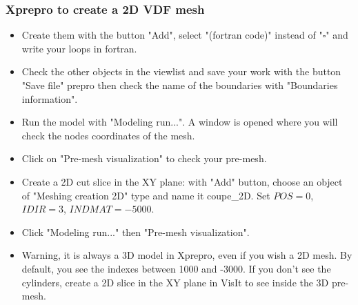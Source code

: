 \documentclass[10pt, hyperref={unicode=true,pdfusetitle, bookmarks=true,bookmarksnumbered=false,bookmarksopen=false, breaklinks=false,pdfborder={0 0 1},backref=true,colorlinks=true,linkcolor=darkblue,pageanchor}]{beamer}
\begin{document}
\begin{frame}
\frametitle{Xprepro to create a 2D VDF mesh}
\begin{block}{}

\begin{itemize}
\item Create them with the button "Add", select "(fortran code)" instead of "$\square$" and write your loops in fortran.
\item Check the other objects in the viewlist and save your work with the button "Save file" prepro then check the name of the boundaries with "Boundaries information".
\item Run the model with "Modeling run...". A window is opened where you will check the nodes coordinates of the mesh.
\item Click on "Pre-mesh visualization" to check your pre-mesh.

\item Create a 2D cut slice in the XY plane: with "Add" button, choose an object of "Meshing creation 2D" type and name it coupe\_2D. Set $POS=0$, $IDIR=3$, $INDMAT=-5000$.
\item Click "Modeling run..." then "Pre-mesh visualization".
\item Warning, it is always a 3D model in Xprepro, even if you wish a 2D mesh. By default, you see the indexes between 1000 and -3000. If you don't see the cylinders, create a 2D slice in the XY plane in VisIt to see inside the 3D pre-mesh.
\end{itemize}

\end{block}
\end{frame}
\end{document}
